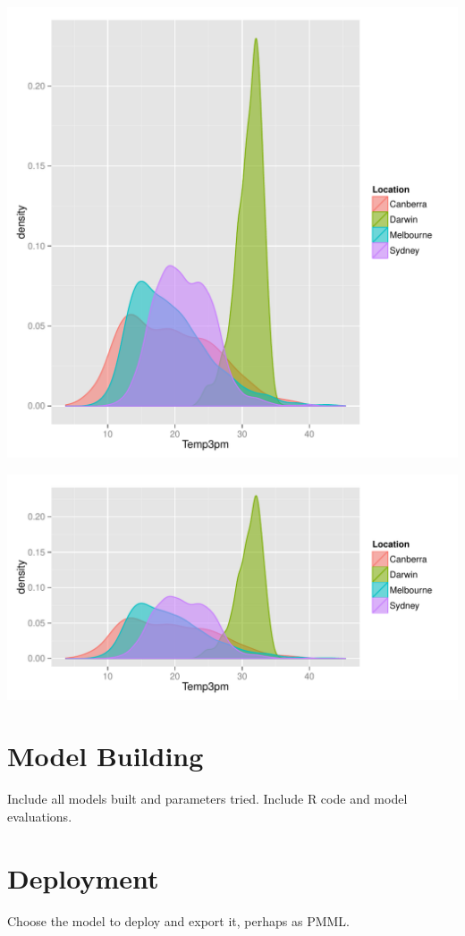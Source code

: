 \documentclass[a4paper]{article}\usepackage[]{graphicx}\usepackage[]{color}
\makeatletter
\def\maxwidth{ %
  \ifdim\Gin@nat@width>\linewidth
    \linewidth
  \else
    \Gin@nat@width
  \fi
}
\newenvironment{knitrout}{}{} %
\makeatother
\begin{document}
\begin{knitrout}
\color{fgcolor}
\includegraphics[width=\maxwidth]{figure/myfigure-1} 

\end{knitrout}

\begin{knitrout}
\color{fgcolor}
\includegraphics[width=\maxwidth]{figure/myfigure2-1} 

\end{knitrout}
\section{Model Building}

Include all models built and parameters tried. Include R code and model evaluations.

\section{Deployment}

Choose the model to deploy and export it, perhaps as PMML.
\end{document}
